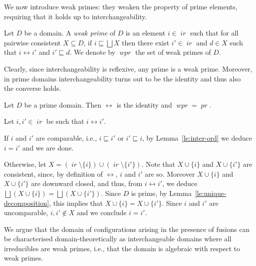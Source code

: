 \documentclass[conference]{IEEEtran}
\renewenvironment{proof}{\begin{IEEEproof}}{\end{IEEEproof}}
\newcommand{\wi}{{interchangeable}}
\newcommand{\pr}[1]{\ensuremath{\mathop{\mathit{pr}({#1})}}}
\newcommand{\wpr}[1]{\ensuremath{\mathop{\mathit{wpr}({#1})}}}
\newcommand{\ir}[1]{\ensuremath{\mathop{\mathit{ir}({#1})}}}
\newcommand{\pred}[1]{\ensuremath{\mathit{p}({#1})}}
\begin{document}
We now introduce weak primes: they weaken the property
of prime elements, requiring that it holds up to
interchangeability.

\begin{definition}
  \label{de:weak-prime}
  Let $D$ be a domain. A \emph{weak prime} of $D$ is an element
  $i \in \ir{D}$ such that for all pairwise consistent
  $X \subseteq D$, if $i \sqsubseteq \bigsqcup X$ then there exist
  $i' \in \ir{D}$ and $d \in X$ such that $i \leftrightarrow i'$ and
  $i' \sqsubseteq d$. We denote by $\wpr{D}$ the set of weak primes of
  $D$.
\end{definition}

Clearly, since interchangeability is reflexive, any prime is a weak
prime. Moreover, in prime domains interchangeability turns out to be
the identity and thus also the converse holds.

\begin{lemma}
  \label{le:interchange-id-pad}
  Let $D$ be a prime domain. Then $\leftrightarrow$ is the
  identity and $\wpr{D} = \pr{D}$.
\end{lemma}

\begin{proof}
  Let $i, i' \in \ir{D}$ be such that $i \leftrightarrow i'$. 

  If $i$ and $i'$ are comparable, i.e., $i \sqsubseteq i'$ or
  $i' \sqsubseteq i$, by Lemma~\ref{le:inter-ord} we deduce
  $i = i'$ and we are done.

  Otherwise,
  let
  $X = (\ir{i} \setminus \{i\}) \cup (\ir{i'} \setminus \{i'\})$.
  Note that $X \cup \{ i \}$ and $X \cup \{ i' \}$ are consistent,
  since, by definition of $\leftrightarrow$, $i$ and $i'$ are so.
  Moreover $X \cup \{ i \}$ and $X \cup \{ i' \}$ are downward closed,
  and thus, from $i \leftrightarrow i'$, we deduce
  $\bigsqcup(X \cup \{ i \})= \bigsqcup(X \cup \{ i' \})$.  Since $D$
  is prime, by Lemma~\ref{le:unique-decomposition}, this
  implies that $X \cup \{ i \} = X \cup \{ i' \}$.
  Since $i$ and $i'$ are uncomparable,
  $i, i' \not\in X$ and we
  conclude $i=i'$.
\end{proof}


We argue that the domain of configurations arising in the presence of
fusions can be characterised domain-theoretically as {\wi} domains
  where all irreducibles are weak primes, i.e., that the domain is
algebraic with respect to weak primes.
\end{document}
